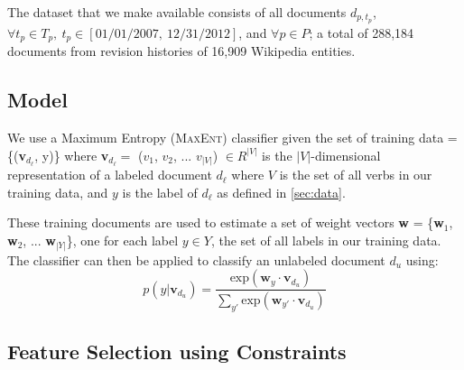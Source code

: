 The dataset that we make available consists of all documents $d_{p, t_p}$, $\forall t_p \in T_p,\ t_p \in [01/01/2007,\ 12/31/2012]$, and $\forall p \in P$; a total of 288,184 documents from revision histories of 16,909 Wikipedia entities.



\subsection{Model}
We use a Maximum Entropy (\textsc{MaxEnt}) classifier given the set of training data = \{(\textbf{v}$_{d_{\ell}}$, y)\} where \textbf{v}$_{d_{\ell}} =$ ($v_1$, $v_2$, ... $v_{|V|}$) $\in R^{|V|}$ is the $|V|$-dimensional representation of a labeled document $d_{\ell}$ where $V$ is the set of all verbs in our training data, and $y$ is the label of $d_{\ell}$ as defined in \ref{sec:data}.

These training documents are used to estimate a set of weight vectors \textbf{w} = \{\textbf{w}$_1$, \textbf{w}$_2$, ... \textbf{w}$_{|Y|}$\}, one for each label $y \in Y$, the set of all labels in our training data. The classifier can then be applied to classify an unlabeled document $d_{\textit{u}}$ using: 
\scriptsize
 \begin{equation}
	p(y|\textbf{v}_{d_{\textit{u}}}) = \frac{\mathrm{exp}  (\textbf{w}_{y} \cdot \textbf{v}_{d_{\textit{u}}})}{\sum_{y'} \mathrm{exp} (\textbf{w}_{y'} \cdot \textbf{v}_{d_{\textit{u}}})} \label{eqn:maxent}
\end{equation}
\normalsize
\subsection{Feature Selection using Constraints}


